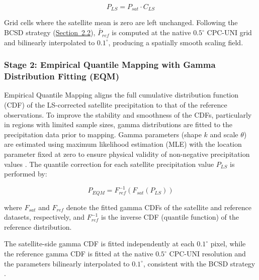 \documentclass[11pt,a4paper]{article}
\begin{document}
\begin{equation}P_{LS} = P_{sat} \cdot C_{LS}\end{equation}

Grid cells where the satellite mean is zero are left unchanged. Following the BCSD strategy (\hyperref[data-and-preprocessing]{Section~2.2}), \(\bar{P}_{ref}\) is computed at the native \(0.5^{\circ}\) CPC-UNI grid and bilinearly interpolated to \(0.1^{\circ}\), producing a spatially smooth scaling field.

\subsubsection{Stage 2: Empirical Quantile Mapping with Gamma Distribution Fitting (EQM)}\label{stage-2-eqm}

Empirical Quantile Mapping aligns the full cumulative distribution
function (CDF) of the LS-corrected satellite precipitation to that of
the reference observations. To improve the stability and smoothness of
the CDFs, particularly in regions with limited sample sizes, gamma
distributions are fitted to the precipitation data prior to mapping.
Gamma parameters (shape \(k\) and scale \(\theta\)) are estimated using
maximum likelihood estimation (MLE) with the location parameter fixed at
zero to ensure physical validity of non-negative precipitation values
\cite{ref15}. The quantile correction for each satellite precipitation value
\(P_{LS}\) is performed by:

\begin{equation}P_{EQM} = F_{ref}^{-1}\left( F_{sat}\left( P_{LS} \right) \right)\end{equation}

where \(F_{sat}\) and \(F_{ref}\) denote the fitted gamma CDFs of the
satellite and reference datasets, respectively, and \(F_{ref}^{-1}\) is
the inverse CDF (quantile function) of the reference distribution.

The satellite-side gamma CDF is fitted independently at each \(0.1^{\circ}\) pixel, while the reference gamma CDF is fitted at the native \(0.5^{\circ}\) CPC-UNI resolution and the parameters bilinearly interpolated to \(0.1^{\circ}\), consistent with the BCSD strategy \cite{ref23}.
\end{document}
